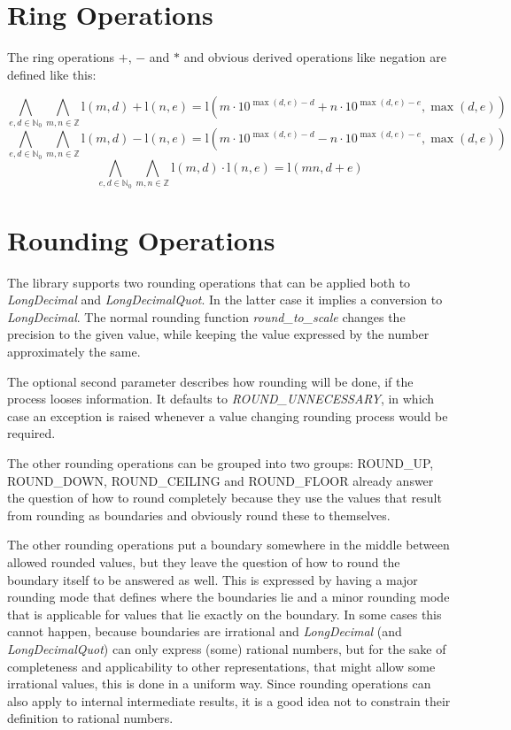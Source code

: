 \documentclass[10pt,a4paper]{article}
\def\ld{\mathrm l}
\begin{document}
\pagebreak

\section{Ring Operations}

The ring operations $+$, $-$ and $*$ and obvious derived operations
like negation are defined like this:

$$\bigwedge_{e,d \in \mathbb{N}_0} \bigwedge_{m, n \in \mathbb{Z}}
\ld(m,d) + \ld(n,e) = \ld(m \cdot 10^{\max(d, e)-d} + n \cdot 10^{\max(d, e)-e}, \max(d, e))$$
$$\bigwedge_{e,d \in \mathbb{N}_0} \bigwedge_{m, n \in \mathbb{Z}}
\ld(m,d) - \ld(n,e) = \ld(m \cdot 10^{\max(d, e)-d} - n \cdot 10^{\max(d, e)-e}, \max(d, e))$$
$$\bigwedge_{e,d \in \mathbb{N}_0} \bigwedge_{m, n \in \mathbb{Z}}
\ld(m,d) \cdot \ld(n,e) = \ld(m n, d+e)$$

\pagebreak

\section{Rounding Operations}

The library supports two rounding operations that can be applied both
to {\slshape LongDecimal\/} and {\slshape LongDecimalQuot\/}.  In the
latter case it implies a conversion to {\slshape LongDecimal\/}.  The
normal rounding function {\slshape round\_to\_scale\/} changes the
precision to the given value, while keeping the value expressed by the
number approximately the same.

The optional second parameter describes how rounding will be done, if the
process looses information.  It defaults to {\slshape
ROUND\_UNNECESSARY\/}, in which case an exception is raised whenever
a value changing rounding process would be required.

The other rounding operations can be grouped into two groups:
ROUND\_UP, ROUND\_DOWN, ROUND\_CEILING and ROUND\_FLOOR already answer
the question of how to round completely because they use the values
that result from rounding as boundaries and obviously round these to
themselves.

The other rounding operations put a boundary somewhere in the middle
between allowed rounded values, but they leave the question of how to
round the boundary itself to be answered as well.  This is expressed
by having a major rounding mode that defines where the boundaries lie
and a minor rounding mode that is applicable for values that lie
exactly on the boundary. In some cases this cannot happen, because
boundaries are irrational and {\slshape LongDecimal\/} (and {\slshape LongDecimalQuot\/}) can
only express (some) rational numbers, but for the sake of completeness
and applicability to other representations, that might allow some
irrational values, this is done in a uniform way.  Since rounding
operations can also apply to internal intermediate results, it is a
good idea not to constrain their definition to rational numbers.
\end{document}
